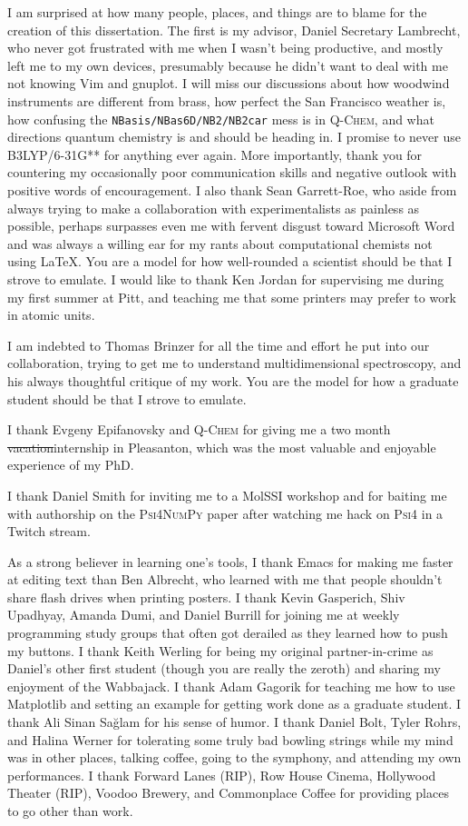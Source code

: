 \documentclass[%
  class = article,%
  crop = false,%
  float = true,%
  multi = true,%
  preview = false,%
]{standalone}
\begin{document}
I am surprised at how many people, places, and things are to blame for the creation of this dissertation. The first is my advisor, Daniel Secretary Lambrecht, who never got frustrated with me when I wasn't being productive, and mostly left me to my own devices, presumably because he didn't want to deal with me not knowing Vim and gnuplot. I will miss our discussions about how woodwind instruments are different from brass, how perfect the San Francisco weather is, how confusing the \texttt{NBasis/NBas6D/NB2/NB2car} mess is in \textsc{Q-Chem}, and what directions quantum chemistry is and should be heading in. I promise to never use B3LYP/6-31G** for anything ever again. More importantly, thank you for countering my occasionally poor communication skills and negative outlook with positive words of encouragement. I also thank Sean Garrett-Roe, who aside from always trying to make a collaboration with experimentalists as painless as possible, perhaps surpasses even me with fervent disgust toward Microsoft Word and was always a willing ear for my rants about computational chemists not using \LaTeX{}. You are a model for how well-rounded a scientist should be that I strove to emulate. I would like to thank Ken Jordan for supervising me during my first summer at Pitt, and teaching me that some printers may prefer to work in atomic units.

I am indebted to Thomas Brinzer for all the time and effort he put into our collaboration, trying to get me to understand multidimensional spectroscopy, and his always thoughtful critique of my work. You are the model for how a graduate student should be that I strove to emulate.

I thank Evgeny Epifanovsky and \textsc{Q-Chem} for giving me a two month \st{vacation}internship in Pleasanton, which was the most valuable and enjoyable experience of my PhD.

I thank Daniel Smith for inviting me to a MolSSI workshop and for baiting me with authorship on the \textsc{Psi4NumPy} paper after watching me hack on \textsc{Psi4} in a Twitch stream.

As a strong believer in learning one's tools, I thank Emacs for making me faster at editing text than Ben Albrecht, who learned with me that people shouldn't share flash drives when printing posters. I thank Kevin Gasperich, Shiv Upadhyay, Amanda Dumi, and Daniel Burrill for joining me at weekly programming study groups that often got derailed as they learned how to push my buttons. I thank Keith Werling for being my original partner-in-crime as Daniel's other first student (though you are really the zeroth) and sharing my enjoyment of the Wabbajack. I thank Adam Gagorik for teaching me how to use Matplotlib and setting an example for getting work done as a graduate student. I thank Ali Sinan Sa{\u{g}}lam for his sense of humor. I thank Daniel Bolt, Tyler Rohrs, and Halina Werner for tolerating some truly bad bowling strings while my mind was in other places, talking coffee, going to the symphony, and attending my own performances. I thank Forward Lanes (RIP), Row House Cinema, Hollywood Theater (RIP), Voodoo Brewery, and Commonplace Coffee for providing places to go other than work.
\end{document}
